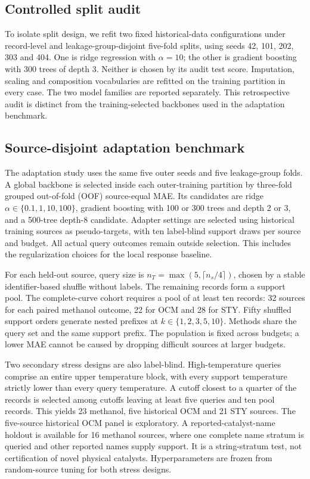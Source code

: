 \documentclass[11pt]{article}
\begin{document}
\subsection{Controlled split audit}
To isolate split design, we refit two fixed historical-data configurations under record-level and leakage-group-disjoint five-fold splits, using seeds 42, 101, 202, 303 and 404. One is ridge regression with $\alpha=10$; the other is gradient boosting with 300 trees of depth 3. Neither is chosen by its audit test score. Imputation, scaling and composition vocabularies are refitted on the training partition in every case. The two model families are reported separately. This retrospective audit is distinct from the training-selected backbones used in the adaptation benchmark.

\subsection{Source-disjoint adaptation benchmark}
The adaptation study uses the same five outer seeds and five leakage-group folds. A global backbone is selected inside each outer-training partition by three-fold grouped out-of-fold (OOF) source-equal MAE. Its candidates are ridge $\alpha\in\{0.1,1,10,100\}$, gradient boosting with 100 or 300 trees and depth 2 or 3, and a 500-tree depth-8 candidate. Adapter settings are selected using historical training sources as pseudo-targets, with ten label-blind support draws per source and budget. All actual query outcomes remain outside selection. This includes the regularization choices for the local response baseline.

For each held-out source, query size is $n_T=\max(5,\lceil n_s/4\rceil)$, chosen by a stable identifier-based shuffle without labels. The remaining records form a support pool. The complete-curve cohort requires a pool of at least ten records: 32 sources for each paired methanol outcome, 22 for OCM and 28 for STY. Fifty shuffled support orders generate nested prefixes at $k\in\{1,2,3,5,10\}$. Methods share the query set and the same support prefix. The population is fixed across budgets; a lower MAE cannot be caused by dropping difficult sources at larger budgets.

Two secondary stress designs are also label-blind. High-temperature queries comprise an entire upper temperature block, with every support temperature strictly lower than every query temperature. A cutoff closest to a quarter of the records is selected among cutoffs leaving at least five queries and ten pool records. This yields 23 methanol, five historical OCM and 21 STY sources. The five-source historical OCM panel is exploratory. A reported-catalyst-name holdout is available for 16 methanol sources, where one complete name stratum is queried and other reported names supply support. It is a string-stratum test, not certification of novel physical catalysts. Hyperparameters are frozen from random-source tuning for both stress designs.
\end{document}
